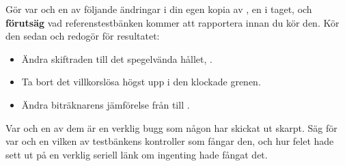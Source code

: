  Gör var och en av följande ändringar i din egen kopia av , en i
taget, och \textbf{förutsäg} vad referenstestbänken kommer att rapportera innan du kör den. Kör den
sedan och redogör för resultatet:
\begin{itemize}
  \item Ändra skiftraden till det spegelvända hållet,
    .
  \item Ta bort det villkorslösa  högst upp i den klockade grenen.
  \item Ändra biträknarens jämförelse från  till .
\end{itemize}

Var och en av dem är en verklig bugg som någon har skickat ut skarpt. Säg för var och en vilken av
testbänkens kontroller som fångar den, och hur felet hade sett ut på en verklig seriell länk om
ingenting hade fångat det.
